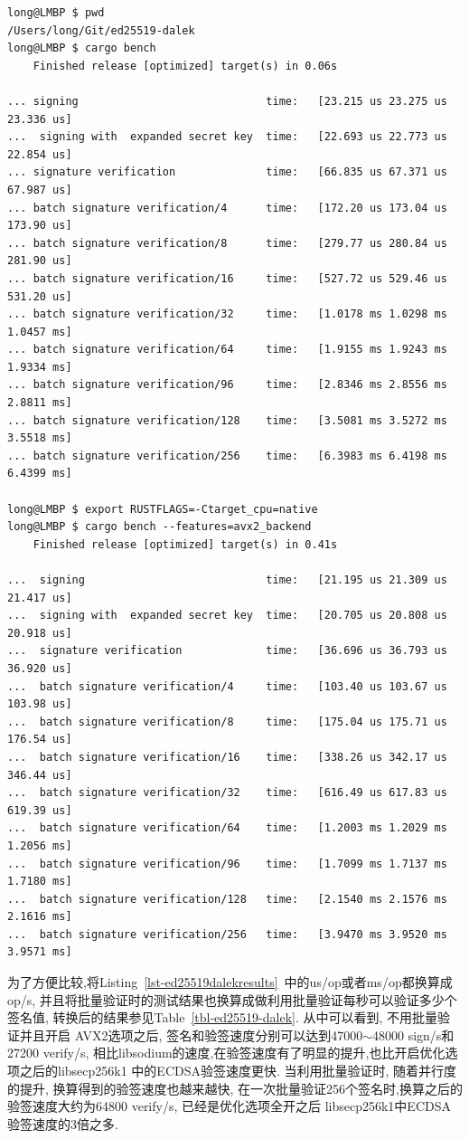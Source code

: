 \begin{lstlisting}[caption=Ed25519 Speed in ed25519-dalek, label=lst-ed25519dalekresults]
long@LMBP $ pwd
/Users/long/Git/ed25519-dalek
long@LMBP $ cargo bench
    Finished release [optimized] target(s) in 0.06s

... signing         					time:   [23.215 us 23.275 us 23.336 us]
...  signing with  expanded secret key	time:   [22.693 us 22.773 us 22.854 us]                        
... signature verification 				time:   [66.835 us 67.371 us 67.987 us]
... batch signature verification/4 		time:   [172.20 us 173.04 us 173.90 us]
... batch signature verification/8 		time:   [279.77 us 280.84 us 281.90 us]
... batch signature verification/16 	time:   [527.72 us 529.46 us 531.20 us]
... batch signature verification/32 	time:   [1.0178 ms 1.0298 ms 1.0457 ms]
... batch signature verification/64 	time:   [1.9155 ms 1.9243 ms 1.9334 ms]
... batch signature verification/96 	time:   [2.8346 ms 2.8556 ms 2.8811 ms]
... batch signature verification/128 	time:   [3.5081 ms 3.5272 ms 3.5518 ms]
... batch signature verification/256 	time:   [6.3983 ms 6.4198 ms 6.4399 ms]
 
long@LMBP $ export RUSTFLAGS=-Ctarget_cpu=native
long@LMBP $ cargo bench --features=avx2_backend
    Finished release [optimized] target(s) in 0.41s
    
...  signing         					time:   [21.195 us 21.309 us 21.417 us]
...  signing with  expanded secret key 	time:   [20.705 us 20.808 us 20.918 us]
...  signature verification 			time:   [36.696 us 36.793 us 36.920 us]
...  batch signature verification/4 	time:   [103.40 us 103.67 us 103.98 us]
...  batch signature verification/8 	time:   [175.04 us 175.71 us 176.54 us]
...  batch signature verification/16 	time:   [338.26 us 342.17 us 346.44 us]
...  batch signature verification/32 	time:   [616.49 us 617.83 us 619.39 us]
...  batch signature verification/64 	time:   [1.2003 ms 1.2029 ms 1.2056 ms]
...  batch signature verification/96 	time:   [1.7099 ms 1.7137 ms 1.7180 ms]
...  batch signature verification/128 	time:   [2.1540 ms 2.1576 ms 2.1616 ms]
...  batch signature verification/256 	time:   [3.9470 ms 3.9520 ms 3.9571 ms]
\end{lstlisting}

为了方便比较,将Listing~\ref{lst-ed25519dalekresults}~中的us/op或者ms/op都换算成op/s,
并且将批量验证时的测试结果也换算成做利用批量验证每秒可以验证多少个签名值,
转换后的结果参见Table~\ref{tbl-ed25519-dalek}. 从中可以看到, 不用批量验证并且开启
AVX2选项之后, 签名和验签速度分别可以达到47000$\sim$48000 sign/s和27200 verify/s,
相比libsodium的速度,在验签速度有了明显的提升,也比开启优化选项之后的libsecp256k1
中的ECDSA验签速度更快. 当利用批量验证时, 随着并行度的提升, 换算得到的验签速度也越来越快,
在一次批量验证256个签名时,换算之后的验签速度大约为64800 verify/s, 已经是优化选项全开之后
libsecp256k1中ECDSA验签速度的3倍之多.

